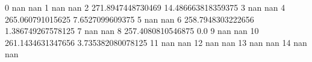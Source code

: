 0 nan nan
1 nan nan
2 271.8947448730469 14.486663818359375
3 nan nan
4 265.060791015625 7.6527099609375
5 nan nan
6 258.7948303222656 1.386749267578125
7 nan nan
8 257.4080810546875 0.0
9 nan nan
10 261.1434631347656 3.735382080078125
11 nan nan
12 nan nan
13 nan nan
14 nan nan

